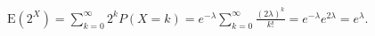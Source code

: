 $\text{E}(2^{X}) = \sum_{k=0}^{\infty}2^{k}P(X=k) = e^{-\lambda}\sum_{k=0}^{\infty}
\frac{(2\lambda)^{k}}{k!} = e^{-\lambda}e^{2\lambda} = e^{\lambda}$.